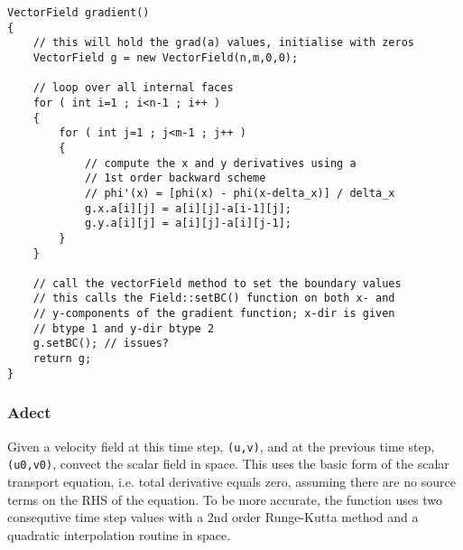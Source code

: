 \documentclass[notitlepage]{article}
\begin{document}
\begin{lstlisting}[style=myCpp]
VectorField gradient()
{
	// this will hold the grad(a) values, initialise with zeros
	VectorField g = new VectorField(n,m,0,0);
	
	// loop over all internal faces
	for ( int i=1 ; i<n-1 ; i++ )
	{
		for ( int j=1 ; j<m-1 ; j++ )
		{
			// compute the x and y derivatives using a
			// 1st order backward scheme
			// phi'(x) = [phi(x) - phi(x-delta_x)] / delta_x
			g.x.a[i][j] = a[i][j]-a[i-1][j];
			g.y.a[i][j] = a[i][j]-a[i][j-1];
		}
	}
	
	// call the vectorField method to set the boundary values
	// this calls the Field::setBC() function on both x- and
	// y-components of the gradient function; x-dir is given
	// btype 1 and y-dir btype 2
	g.setBC(); // issues?
	return g;
}
\end{lstlisting}

\subsubsection{Adect}

Given a velocity field at this time step, \texttt{(u,v)}, and at the previous time step,
\texttt{(u0,v0)}, convect the scalar field in space. This uses the basic form of the scalar
transport equation, i.e. total derivative equals zero, assuming there are no
source terms on the RHS of the equation. To be more accurate, the function uses
two consequtive time step values with a 2nd order Runge-Kutta method and a
quadratic interpolation routine in space.
\end{document}
